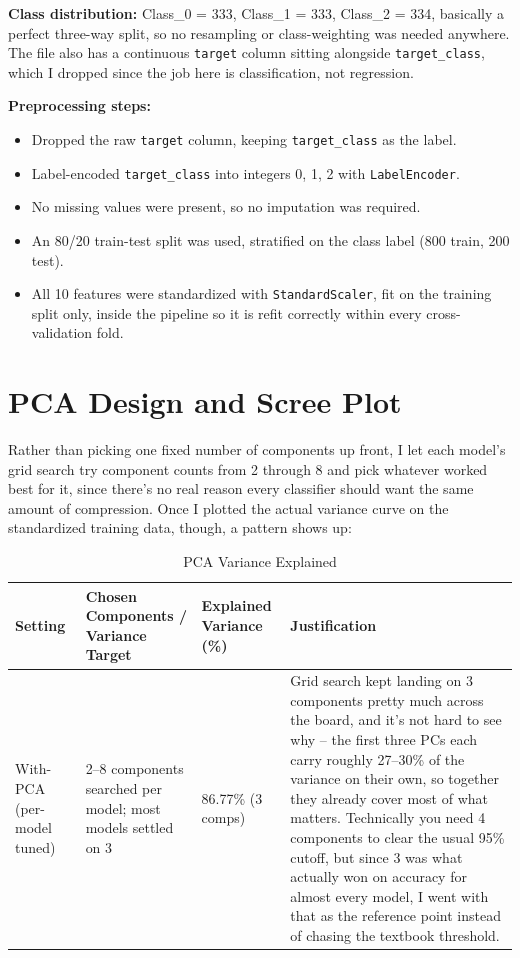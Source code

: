 \documentclass[12pt,a4paper]{article}
\begin{document}
\textbf{Class distribution:} Class\_0 = 333, Class\_1 = 333, Class\_2 = 334, basically a perfect
three-way split, so no resampling or class-weighting was needed anywhere. The file also has a
continuous \texttt{target} column sitting alongside \texttt{target\_class}, which I dropped since the
job here is classification, not regression.

\textbf{Preprocessing steps:}
\begin{itemize}
\item Dropped the raw \texttt{target} column, keeping \texttt{target\_class} as the label.
\item Label-encoded \texttt{target\_class} into integers 0, 1, 2 with \texttt{LabelEncoder}.
\item No missing values were present, so no imputation was required.
\item An 80/20 train-test split was used, stratified on the class label (800 train, 200 test).
\item All 10 features were standardized with \texttt{StandardScaler}, fit on the training split only,
inside the pipeline so it is refit correctly within every cross-validation fold.
\end{itemize}

\section{PCA Design and Scree Plot}
Rather than picking one fixed number of components up front, I let each model's grid search try
component counts from 2 through 8 and pick whatever worked best for it, since there's no real reason
every classifier should want the same amount of compression. Once I plotted the actual variance curve
on the standardized training data, though, a pattern shows up:

\begin{table}[H]
\centering
\caption{PCA Variance Explained}
\begin{tabular}{p{3.5cm}p{4.5cm}p{2.7cm}p{4.5cm}}
\toprule
Setting & Chosen Components / Variance Target & Explained Variance (\%) & Justification \\
\midrule
With-PCA (per-model tuned) & 2--8 components searched per model; most models settled on 3 & 86.77\% (3 comps) & Grid search kept landing on 3 components pretty much across the board, and it's not hard to see why -- the first three PCs each carry roughly 27--30\% of the variance on their own, so together they already cover most of what matters. Technically you need 4 components to clear the usual 95\% cutoff, but since 3 was what actually won on accuracy for almost every model, I went with that as the reference point instead of chasing the textbook threshold. \\
\bottomrule
\end{tabular}
\end{table}
\end{document}
